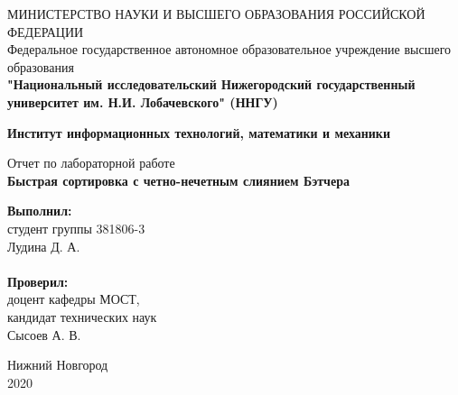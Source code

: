 \documentclass[a4paper]{report}
\begin{document}
\begin{titlepage}
\begin{center}
МИНИСТЕРСТВО НАУКИ И ВЫСШЕГО ОБРАЗОВАНИЯ РОССИЙСКОЙ ФЕДЕРАЦИИ\\
Федеральное государственное автономное образовательное учреждение высшего образования \\
\textbf{"Национальный исследовательский Нижегородский государственный университет им. Н.И. Лобачевского" (ННГУ)}
\end{center}

\begin{center}
\textbf{Институт информационных технологий, математики и механики}
\end{center}
\vspace{4em}

\begin{center}
Отчет по лабораторной работе \\
\vspace{1em}
\textbf{\Large Быстрая сортировка с четно-нечетным слиянием Бэтчера} \\
\end{center}

\vspace{4em}

\newbox{\lbox}
\newlength{\maxl}
\setlength{\maxl}{\wd\lbox}
\hfill\parbox{7cm}{
\textbf{Выполнил:} \\ 
студент группы 381806-3 \\
Лудина Д. А. \\
\\
\textbf{Проверил:} \\ 
доцент кафедры МОСТ, \\ 
кандидат технических наук \\ 
Сысоев А. В.
}
\vspace{\fill}

\begin{center} Нижний Новгород \\ 2020 \end{center}
\end{titlepage}

\setcounter{page}{2}
\tableofcontents{}
\clearpage
\end{document}
